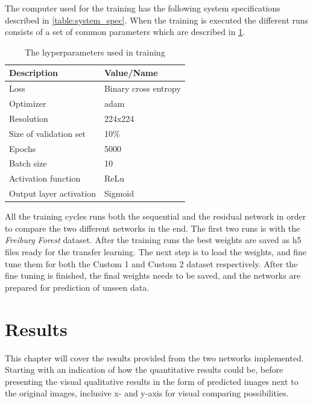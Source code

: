 \documentclass[USenglish]{ifimaster}  %
\begin{document}
The computer used for the training has the following system specifications described in \cref{table:system_spec}.
When the training is executed the different runs consists of a set of common parameters which are described in \cref{table:hyperparameters}. 

\begin{table}[ht]
\centering
\begin{tabular}{ll}
\hline
\textbf{Description} & \textbf{Value/Name}  \\ \hline
Loss &  Binary cross entropy\\
Optimizer &  adam \\
Resolution & 224x224 \\
Size of validation set & 10\%  \\
Epochs &  5000 \\ 
Batch size & 10\\
Activation function & ReLu\\
Output layer activation & Sigmoid \\ \hline
\end{tabular}
\caption{The hyperparameters used in training}
\label{table:hyperparameters}
\end{table}
All the training cycles runs both the sequential and the residual network in order to compare the two different networks in the end. The first two runs is with the \textit{Freiburg Forest} dataset. After the training runs the best weights are saved as h5 files ready for the transfer learning. The next step is to load the weights, and fine tune them for both the Custom 1 and Custom 2 dataset respectively. After the fine tuning is finished, the final weights needs to be saved, and the networks are prepared for prediction of unseen data.    

\chapter{Results} 
This chapter will cover the results provided from the two networks implemented. Starting with an indication of how the quantitative results could be, before presenting the visual qualitative results in the form of predicted images next to the original images, inclusive x- and y-axis for visual comparing possibilities. 
\end{document}
